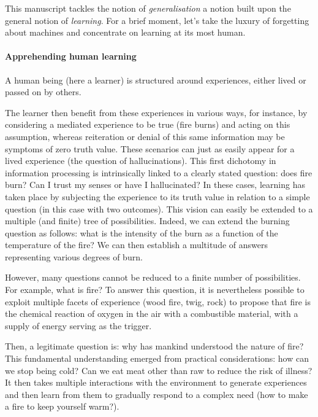 
This manuscript tackles the notion of \emph{generalisation} a notion built upon the general notion of \emph{learning}. For a brief moment, let's take the luxury of forgetting about machines and concentrate on learning at its most human. 

\paragraph{Apprehending human learning} A human being (here a learner) is structured around experiences, either lived or passed on by others. 

The learner then benefit from these experiences in various ways, for instance, by considering a mediated experience to be true (fire burns) and acting on this assumption, whereas reiteration or denial of this same information may be symptoms of zero truth value.  These scenarios can just as easily appear for a lived experience (the question of hallucinations). This first dichotomy in information processing is intrinsically linked to a clearly stated question: does fire burn? Can I trust my senses or have I hallucinated? In these cases, learning has taken place by subjecting the experience to its truth value in relation to a simple question (in this case with two outcomes).  This vision can easily be extended to a multiple (and finite) tree of possibilities. Indeed, we can extend the burning question as follows: what is the intensity of the burn as a function of the temperature of the fire? We can then establish a multitude of answers representing various degrees of burn. 

However, many questions cannot be reduced to a finite number of possibilities. For example, what is fire? To answer this question, it is nevertheless possible to exploit multiple facets of experience (wood fire, twig, rock) to propose that fire is the chemical reaction of oxygen in the air with a combustible material, with a supply of energy serving as the trigger. 

Then, a legitimate question is: why has mankind understood the nature of fire? This fundamental understanding emerged from practical considerations: how can we stop being cold? Can we eat meat other than raw to reduce the risk of illness? It then takes multiple interactions with the environment to generate experiences and then learn from them to gradually respond to a complex need (how to make a fire to keep yourself warm?).

